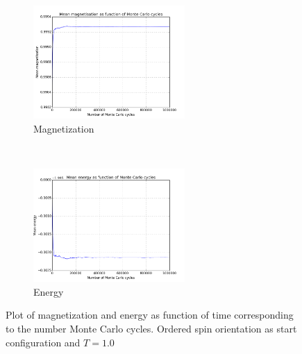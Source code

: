 \documentclass{article}
\begin{document}
\begin{figure}[t!]
    \centering
    \begin{subfigure}[t]{0.6\textwidth}
        \centering
        \includegraphics[height=1.7in]{4cmagnetisation.png}
        \caption{Magnetization}
    \end{subfigure}%
    ~ 
    \begin{subfigure}[t]{0.6\textwidth}
        \centering
        \includegraphics[height=1.7in]{4cenergy.png}
        \caption{Energy}
    \end{subfigure}
    \caption{Plot of magnetization and energy as function of time corresponding to the number Monte Carlo cycles. Ordered spin orientation as start configuration and $T = 1.0$}
\end{figure}
\end{document}
